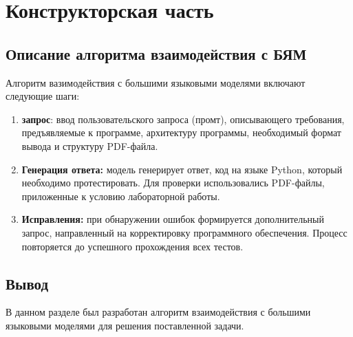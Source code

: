 \chapter{Конструкторская часть}

\section{Описание алгоритма взаимодействия с БЯМ}

Алгоритм вазимодействия с большими языковыми моделями включают следующие шаги:
\begin{enumerate}
	\item \textbf{запрос}: ввод пользовательского запроса (промт), описывающего
	требования, предъявляемые к программе, архитектуру программы, необходимый формат вывода и структуру PDF-файла.
	\item \textbf{Генерация ответа:} модель генерирует ответ, код на языке Python, который необходимо протестировать. Для проверки использовались PDF-файлы, приложенные к условию лабораторной работы.
	\item \textbf{Исправления:} при обнаружении ошибок формируется дополнительный запрос, направленный на корректировку программного обеспечения. Процесс повторяется до успешного прохождения всех тестов.
\end{enumerate}

\section{Вывод}

В данном разделе был разработан алгоритм взаимодействия с большими языковыми моделями для решения поставленной задачи.
